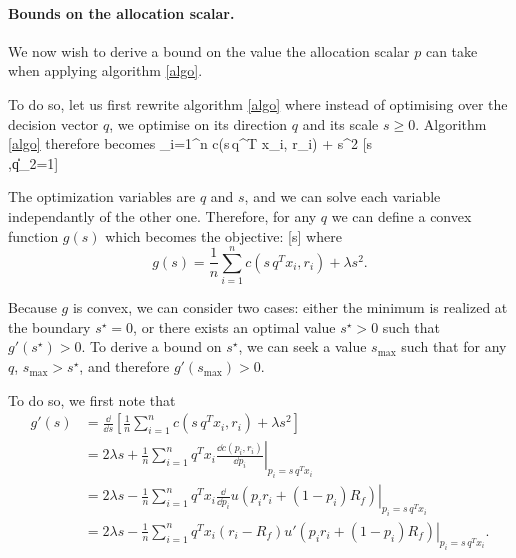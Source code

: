 
\paragraph{Bounds on the allocation scalar.}
We now wish to derive a bound on the value the allocation scalar $p$ can take when
applying algorithm \eqref{algo}.

To do so, let us first rewrite algorithm \eqref{algo} where instead of optimising over the
decision vector $q$, we optimise on its direction $q$ and its scale $s\geq0$. Algorithm
\eqref{algo} therefore becomes \minimizeEquation%
{\sum_{i=1}^n c(s\,q^T x_i, r_i) + \lambda s^2}%
[s\\,\|q\|_2=1]

The optimization variables are $q$ and $s$, and we can solve each variable independantly
of the other one. Therefore, for any $q$ we can define a convex function $g(s)$ which
becomes the objective: [s] where
\begin{equation*}
  g(s) = \frac{1}{n} \sum_{i=1}^n c(s\,q^T x_i, r_i) + \lambda s^2.
\end{equation*}

Because $g$ is convex, we can consider two cases: either the minimum is realized at the
boundary $s^\star=0$, or there exists an optimal value $s^\star > 0$ such that
$g'(s^\star) > 0$. To derive a bound on $s^\star$, we can seek a value $s_{\max}$ such
that for any $q$, $s_{\max} > s^\star$, and therefore $g'(s_{\max}) > 0$.

To do so, we first note that
\begin{align*}
    g'(s) &= \frac{\dd}{\dd s}\left[\frac{1}{n} \sum_{i=1}^n c(s\, q^{T}x_i, r_i) + \lambda s^2\right]\\
          &= 2\lambda s + \frac{1}{n} \sum_{i=1}^n q^{T}x_i \left. \frac{\dd c(p_i,r_i)}{\dd p_i} \right|_{p_i =
            s\,q^{T}x_i} \\
          &= 2\lambda s - \frac{1}{n} \sum_{i=1}^n q^{T}x_i \left. \frac{\dd}{\dd p_i} u(p_i r_i +
            (1-p_i)R_f) \right|_{p_i = s\,q^{T}x_i}\\
          &= 2\lambda s - \frac{1}{n} \sum_{i=1}^n q^{T}x_i (r_i-R_f) \left. u'(p_i r_i +
            (1-p_i)R_f) \right|_{p_i = s\,q^{T}x_i}.
\end{align*}

